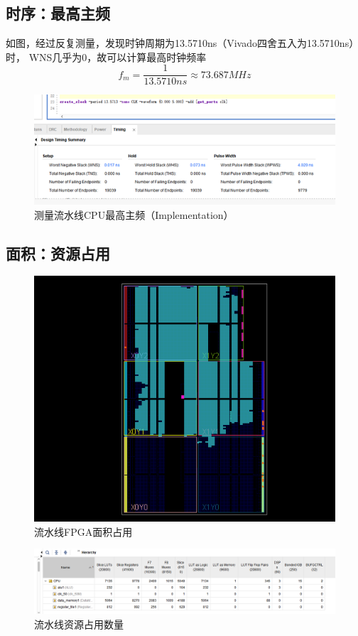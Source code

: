 \documentclass[10pt]{article}
\begin{document}
\subsection{时序：最高主频}
如图，经过反复测量，发现时钟周期为13.5710ns（Vivado四舍五入为13.5710ns）时，
WNS几乎为0，故可以计算最高时钟频率
$$f_m=\frac{1}{13.5710ns}\approx73.687MHz$$
\begin{figure}[H]
    \centering
    \includegraphics[scale=1]{res.png}
    \caption{测量流水线CPU最高主频（Implementation）}
    \end{figure}
\subsection{面积：资源占用}
\begin{figure}[H]
    \centering
    \includegraphics[scale=0.5]{space.png}
    \caption{流水线FPGA面积占用}
    \end{figure}

\begin{figure}[H]
    \centering
    \includegraphics[scale=0.5]{num.png}
    \caption{流水线资源占用数量}
    \end{figure}
\end{document}
